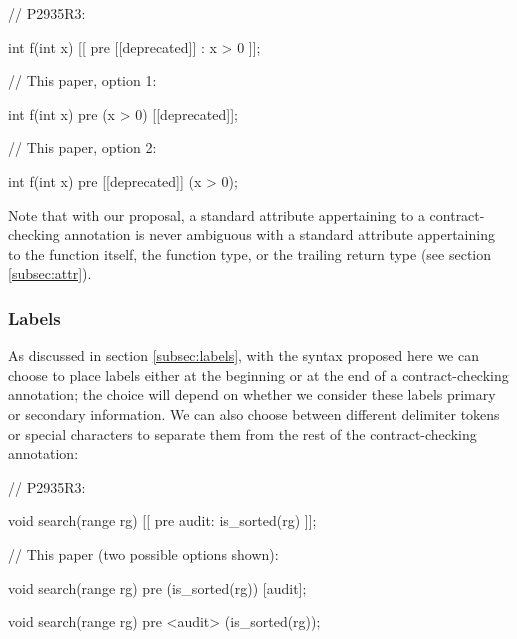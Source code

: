 \begin{minipage}[t]{8cm}
\begin{codeblock}
// P2935R3:

int f(int x) 
  [[ pre [[deprecated]] : x > 0 ]];
\end{codeblock}
\end{minipage}
\begin{minipage}[t]{8cm}
\begin{codeblock}
// This paper, option 1:

int f(int x) 
  pre (x > 0) [[deprecated]];
  
// This paper, option 2:

int f(int x) 
  pre [[deprecated]] (x > 0);
\end{codeblock}
\end{minipage}
\vspace{5mm}

Note that with our proposal, a standard attribute appertaining to a contract-checking annotation is never ambiguous with a standard attribute appertaining to the function itself, the function type, or the trailing return type (see section \ref{subsec:attr}).

\subsubsection{Labels}

As discussed in section \ref{subsec:labels}, with the syntax proposed here we can choose to place labels either at the beginning or at the end of a contract-checking annotation; the choice will depend on whether we consider these labels primary or secondary information. We can also choose between different delimiter tokens or special characters to separate them from the rest of the contract-checking annotation:

\begin{minipage}[t]{8cm}
\begin{codeblock}
// P2935R3:

void search(range rg)
  [[ pre audit: is_sorted(rg) ]];
\end{codeblock}
\end{minipage}
\begin{minipage}[t]{8cm}
\begin{codeblock}
// This paper (two possible options shown):

void search(range rg)
  pre (is_sorted(rg)) [audit];
  
void search(range rg)
  pre <audit> (is_sorted(rg));
\end{codeblock}
\end{minipage}
\vspace{3mm}

